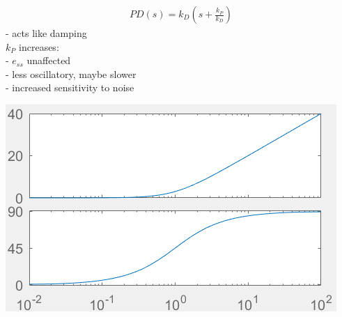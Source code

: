         \begin{minipage}{0.49\linewidth}
            \begin{align*}
                PD(s) = k_D (s + \frac{k_P}{k_D})
            \end{align*}
            - acts like damping\\
            $k_P$ increases:\\
            - $e_{ss}$ unaffected\\
            - less oscillatory, maybe slower\\
            - increased sensitivity to noise\\
        \end{minipage}
        \begin{minipage}{0.49\linewidth}
            \includegraphics[width = \linewidth]{src/images/PD-controller.png}
        \end{minipage}
    
